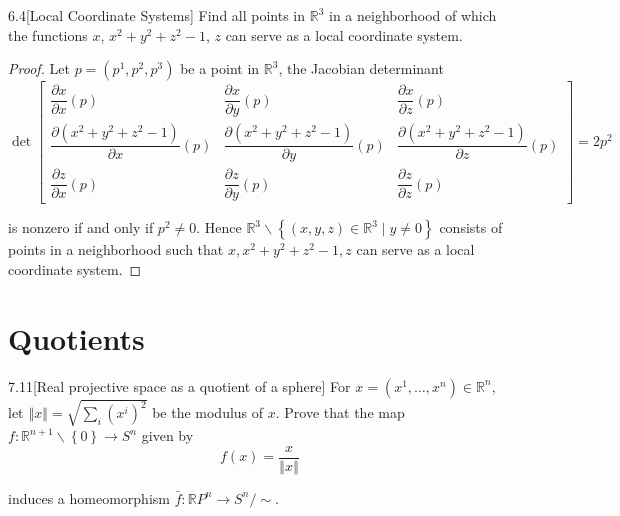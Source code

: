 \begin{problem}{6.4}[Local Coordinate Systems]
Find all points in \(\mathbb{R}^{3}\) in a neighborhood of which the functions \(x\), \(x^{2} + y^{2} + z^{2} - 1\), \(z\) can serve as a local coordinate system.
\end{problem}

\begin{proof}
    Let \( p = (p^{1}, p^{2}, p^{3}) \) be a point in \( \mathbb{R}^{3} \), the Jacobian determinant
    \[
        \det\begin{bmatrix}
            \dfrac{\partial x}{\partial x}(p)                           & \dfrac{\partial x}{\partial y}(p)                           & \dfrac{\partial x}{\partial z}(p)                           \\
            \dfrac{\partial (x^{2} + y^{2} + z^{2} - 1)}{\partial x}(p) & \dfrac{\partial (x^{2} + y^{2} + z^{2} - 1)}{\partial y}(p) & \dfrac{\partial (x^{2} + y^{2} + z^{2} - 1)}{\partial z}(p) \\
            \dfrac{\partial z}{\partial x}(p)                           & \dfrac{\partial z}{\partial y}(p)                           & \dfrac{\partial z}{\partial z}(p)
        \end{bmatrix} = 2p^{2}
    \]

    is nonzero if and only if \( p^{2} \ne 0 \). Hence \( \mathbb{R}^{3} \smallsetminus \left\{ (x, y, z) \in \mathbb{R}^{3} \mid y \ne 0 \right\} \) consists of points in a neighborhood such that \( x, x^{2} + y^{2} + z^{2} - 1, z \) can serve as a local coordinate system.
\end{proof}

\section{Quotients}

\begin{exercise}{7.11}[Real projective space as a quotient of a sphere]\label{exercise:7.11}
    For \( x = (x^{1}, \ldots, x^{n}) \in \mathbb{R}^{n} \), let \( \left\Vert x \right\Vert = \sqrt{\sum_{i}{(x^{i})}^{2}} \) be the modulus of \( x \). Prove that the map \( f: \mathbb{R}^{n+1}\smallsetminus \left\{0\right\} \to S^{n} \) given by
    \[
        f(x) = \dfrac{x}{\left\Vert x \right\Vert}
    \]

    induces a homeomorphism  \( \bar{f}: \mathbb{R}P^{n} \to S^{n}/\!\sim \).
\end{exercise}

